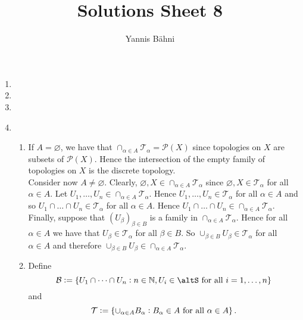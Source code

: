 

\title{Solutions Sheet 8}
\author{Yannis B\"{a}hni}
\address[Yannis B\"{a}hni]{University of Zurich, R\"{a}mistrasse 71, 8006 Zurich}



\maketitle
\thispagestyle{fancy}

\setcounter{section}{1}

\begin{enumerate}[label = \textbf{Exercise \arabic*.},wide = 0pt, itemsep = 1.5ex]
	\item
	\item
	\item
	\item
		~
		\begin{enumerate}[label = \textbf{\alph*.},wide = 0pt, itemsep = 1.5ex]
			\item If $A = \varnothing$, we have that $\cap_{\alpha \in A} \mathcal{T}_\alpha = \mathcal{P}(X)$ since topologies on $X$ are subsets of $\mathcal{P}(X)$. Hence the intersection of the empty family of topologies on $X$ is the discrete topology.\\
				Consider now $A \neq \varnothing$. Clearly, $\varnothing, X \in \cap_{\alpha \in A} \mathcal{T}_\alpha$ since $\varnothing,X \in \mathcal{T}_{\alpha}$ for all $\alpha \in A$. Let $U_1,\dots,U_n \in \cap_{\alpha \in A}\mathcal{T}_\alpha$. Hence $U_1,\dots,U_n \in \mathcal{T}_\alpha$ for all $\alpha \in A$ and so $U_1 \cap \dots \cap U_n \in \mathcal{T}_\alpha$ for all $\alpha \in A$. Hence $U_1 \cap \dots \cap U_n \in \cap_{\alpha \in A}\mathcal{T}_\alpha$. Finally, suppose that $(U_\beta)_{\beta \in B}$ is a family in $\cap_{\alpha \in A} \mathcal{T}_\alpha$. Hence for all $\alpha \in A$ we have that $U_\beta \in \mathcal{T}_\alpha$ for all $\beta \in B$. So $\cup_{\beta \in B} U_\beta \in \mathcal{T}_\alpha$ for all $\alpha \in A$ and therefore $\cup_{\beta \in B} U_\beta \in \cap_{\alpha \in A} \mathcal{T}_\alpha$.
			\item Define
				\begin{equation*}
					\mathcal{B} := \cbr{U_1 \cap \dots \cap U_n : n \in \mathbb{N},U_i \in \mathcal{\altS} \text{ for all } i = 1,\dots,n}
				\end{equation*}
				\noindent and 
				\begin{equation*}
					\mathcal{T} := \cbr{\textstyle{\cup}_{\alpha \in A} B_\alpha : B_\alpha \in A \text{ for all } \alpha \in A}.
				\end{equation*}
		

\end{enumerate}
\end{enumerate}
